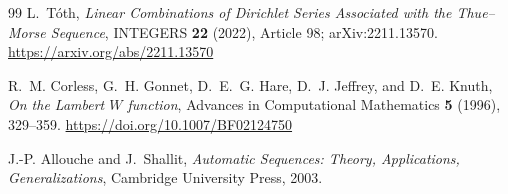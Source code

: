 \documentclass[11pt,oneside]{article}
\numberwithin{equation}{section}
\theoremstyle{definition}
\theoremstyle{remark}
\begin{document}
\begin{thebibliography}{99}
L.~T\'oth,
\emph{Linear Combinations of Dirichlet Series Associated with the Thue--Morse Sequence},
INTEGERS \textbf{22} (2022), Article 98; arXiv:2211.13570.
\url{https://arxiv.org/abs/2211.13570}

R.~M. Corless, G.~H. Gonnet, D.~E.~G. Hare, D.~J. Jeffrey, and D.~E. Knuth,
\emph{On the Lambert $W$ function}, Advances in Computational Mathematics \textbf{5} (1996),
329--359.
\url{https://doi.org/10.1007/BF02124750}

J.-P. Allouche and J.~Shallit,
\emph{Automatic Sequences: Theory, Applications, Generalizations}, Cambridge University
Press, 2003.

\end{thebibliography}
\end{document}
